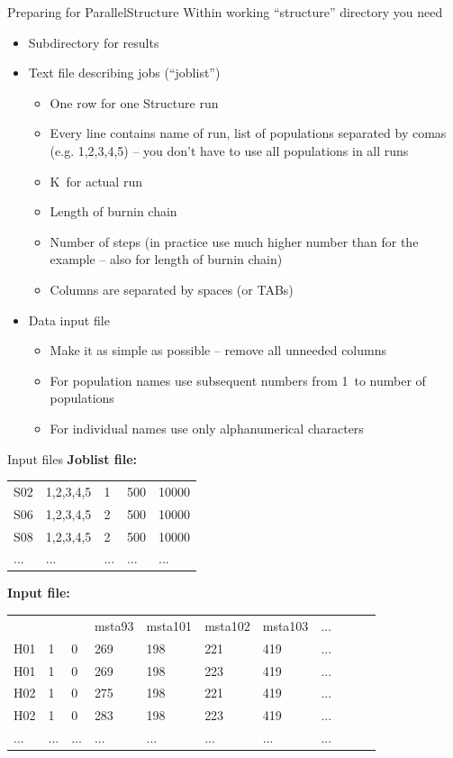 \documentclass[compress, ucs, xelatex, 11pt, xcolor=svgnames,
  hyperref={
    bookmarks=true,
    unicode=true,
    colorlinks=true,
    pdftitle={Molecular data in R},
    plainpages=false,
    pdfauthor={Vojtech Zeisek},
    pdfsubject={Course about phylogeny and evolution in R},
    pdfcreator={XeLaTeX},
    pdfkeywords={R, evolution, phylogeny, molecular data},
    linkcolor=Tomato,
    anchorcolor=SaddleBrown,
    citecolor=Goldenrod,
    filecolor=DarkMagenta,
    menucolor=Sienna,
    urlcolor=DarkTurquoise,
    pdftex},
  url={hyphens, lowtilde} %
  ]{beamer}
\begin{document}
\begin{frame}{Preparing for ParallelStructure}
Within working ``structure'' directory you need
\begin{itemize}
 \item Subdirectory for results
 \item Text file describing jobs (``joblist'')
  \begin{itemize}
    \item One row for one Structure run
    \item Every line contains name of run, list of populations separated by comas (e.g. 1,2,3,4,5) -- you don't have to use all populations in all runs
    \item K~for actual run
    \item Length of burnin chain
    \item Number of steps (in practice use much higher number than for the example -- also for length of burnin chain)
    \item Columns are separated by spaces (or TABs)
  \end{itemize}
 \item Data input file
  \begin{itemize}
    \item Make it as simple as possible -- remove all unneeded columns
    \item For population names use subsequent numbers from 1~to number of populations
    \item For individual names use only alphanumerical characters
  \end{itemize}
\end{itemize}
\end{frame}

\begin{frame}[fragile]{Input files}
\textbf{Joblist file:}\\
\vfill
\begin{tabular}{lllll}
S02 & 1,2,3,4,5 & 1 & 500 & 10000\\
S06 & 1,2,3,4,5 & 2 & 500 & 10000\\
S08 & 1,2,3,4,5 & 2 & 500 & 10000\\
... & ... & ... & ... & ...\\
\end{tabular}
\vfill
\textbf{Input file:}\\
\vfill
\begin{tabular}{lllllllllll}
 & & & msta93 & msta101 & msta102 & msta103 & ...\\
H01 & 1 & 0 & 269 & 198 & 221 & 419 & ...\\
H01 & 1 & 0 & 269 & 198 & 223 & 419 & ...\\
H02 & 1 & 0 & 275 & 198 & 221 & 419 & ...\\
H02 & 1 & 0 & 283 & 198 & 223 & 419 & ...\\
... & ... & ... & ... & ... & ... & ... & ...
\end{tabular}
\end{frame}
\end{document}
